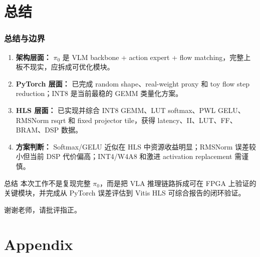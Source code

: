 \documentclass[10pt, aspectratio=169]{beamer}
\begin{document}
\section{总结}

\begin{frame}
  \frametitle{总结与边界}
  \small
  \begin{enumerate}
    \item \textbf{架构层面：} $\pi_0$ 是 VLM backbone + action expert + flow matching，完整上板不现实，应拆成可优化模块。
    \item \textbf{PyTorch 层面：} 已完成 random shape、real-weight proxy 和 toy flow step reduction；INT8 是当前最稳的 GEMM 类量化方案。
    \item \textbf{HLS 层面：} 已实现并综合 INT8 GEMM、LUT softmax、PWL GELU、RMSNorm rsqrt 和 fixed projector tile，获得 latency、II、LUT、FF、BRAM、DSP 数据。
    \item \textbf{方案判断：} Softmax/GELU 近似在 HLS 中资源收益明显；RMSNorm 误差较小但当前 DSP 代价偏高；INT4/W4A8 和激进 activation replacement 需谨慎。
  \end{enumerate}

  \begin{block}{总结}
    本次工作不是复现完整 $\pi_0$，而是把 VLA 推理链路拆成可在 FPGA 上验证的关键模块，并完成从 PyTorch 误差评估到 Vitis HLS 可综合报告的闭环验证。
  \end{block}

  \vspace{10pt}

  \centering
  \small 谢谢老师，请批评指正。
\end{frame}

\appendix

\section{Appendix}
\end{document}
